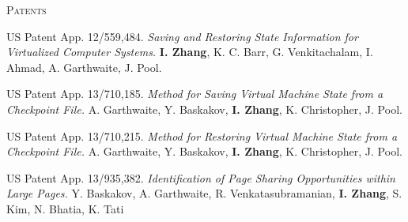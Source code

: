 \documentclass[10pt,times]{report}
\newlength{\sectiongap}
\newlength{\sectioncolwidth}
\newlength{\colgap}
\newlength{\stuffwidth}
\newenvironment{rtable}{
  \begin{minipage}{\textwidth}
  }{
  \end{minipage}
}
\newenvironment{rsection}[1]{
  \begin{minipage}[t]{\sectioncolwidth}
    \textsc{#1}
  \end{minipage}
  \hspace{\colgap}
  \begin{minipage}[t]{\stuffwidth}
  }{
    \removelastskip
  \end{minipage}
  \\[\sectiongap]
}
\begin{document}
\begin{rtable}
  \begin{rsection}{Patents}
    US Patent App. 12/559,484.
    \textit{Saving and Restoring State Information for Virtualized
      Computer Systems.} 
    \textbf{I. Zhang}, K. C. Barr, G. Venkitachalam, I. Ahmad, A. Garthwaite, J. Pool.\\\vspace{-0.5em}

    US Patent App. 13/710,185. 
    \textit{Method for Saving Virtual Machine State from a Checkpoint
    File.}  A. Garthwaite, Y. Baskakov, \textbf{I. Zhang}, K. Christopher,
    J. Pool.\\\vspace{-0.5em}

    US Patent App. 13/710,215. \textit{Method for Restoring Virtual Machine State from a Checkpoint
    File.} A. Garthwaite, Y. Baskakov, \textbf{I. Zhang}, K. Christopher,
    J. Pool.\\\vspace{-0.5em}
    
    US Patent App. 13/935,382. \textit{Identification of Page Sharing Opportunities within Large Pages.} Y. Baskakov, A. Garthwaite, R. Venkatasubramanian, \textbf{I. Zhang}, S. Kim, N. Bhatia, K. Tati\\
  \end{rsection}


\end{rtable}
\end{document}
